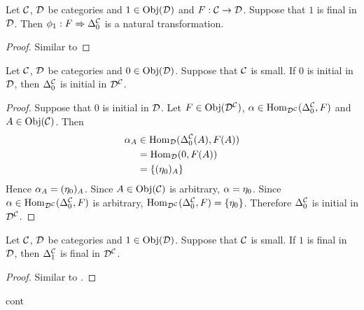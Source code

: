 \documentclass{book}
\begin{document}
	\begin{ex} 
		Let $\mathcal{C}$, $\mathcal{D}$ be categories and $1 \in \operatorname{Obj}(\mathcal{D})$ and $F: \mathcal{C} \rightarrow \mathcal{D}$. Suppose that $1$ is final in $\mathcal{D}$. Then $\phi_{1}: F \Rightarrow \Delta^{\mathcal{C}}_0$ is a natural transformation.
	\end{ex}

	\begin{proof}
		Similar to 
	\end{proof}
	
	\begin{ex} 
		Let $\mathcal{C}$, $\mathcal{D}$ be categories and $0 \in \operatorname{Obj}(\mathcal{D})$. Suppose that $\mathcal{C}$ is small. If $0$ is initial in $\mathcal{D}$, then $\Delta^{\mathcal{C}}_0$ is initial in $\mathcal{D}^{\mathcal{C}}$. 
	\end{ex}

	\begin{proof}
		Suppose that $0$ is initial in $\mathcal{D}$. Let $F \in \operatorname{Obj}(\mathcal{D}^{\mathcal{C}})$, $\alpha \in \operatorname{Hom}_{\mathcal{D}^{\mathcal{C}}}(\Delta^{\mathcal{C}}_0, F)$ and $A \in \operatorname{Obj}(\mathcal{C})$. Then
		\begin{align*}
			\alpha_A 
			& \in \operatorname{Hom}_{\mathcal{D}}(\Delta^{\mathcal{C}}_0(A), F(A)) \\
			& =  \operatorname{Hom}_{\mathcal{D}}(0, F(A)) \\
			& = \{(\eta_0)_A\}
		\end{align*}
		Hence $\alpha_A = (\eta_0)_A$. Since $A \in \operatorname{Obj}(\mathcal{C})$ is arbitrary, $\alpha = \eta_0$. Since $\alpha \in  \operatorname{Hom}_{\mathcal{D}^{\mathcal{C}}}(\Delta^{\mathcal{C}}_0, F)$ is arbitrary, $ \operatorname{Hom}_{\mathcal{D}^{\mathcal{C}}}(\Delta^{\mathcal{C}}_0, F) = \{\eta_0\}$. Therefore $\Delta^{\mathcal{C}}_0$ is initial in $\mathcal{D}^{\mathcal{C}}$.
	\end{proof}


	\begin{ex} 
		Let $\mathcal{C}$, $\mathcal{D}$ be categories and $1 \in \operatorname{Obj}(\mathcal{D})$. Suppose that $\mathcal{C}$ is small. If $1$ is final in $\mathcal{D}$, then $\Delta^{\mathcal{C}}_1$ is final in $\mathcal{D}^{\mathcal{C}}$. 
	\end{ex}

	\begin{proof}
		Similar to .
	\end{proof}
	
\begin{defn}
	cont
\end{defn}
\end{document}
